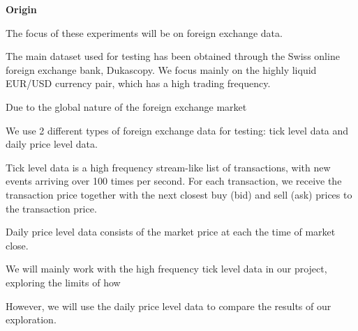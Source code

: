 \documentclass[../main.tex]{subfiles}
\begin{document}
\textbf{Origin}

The focus of these experiments will be on foreign exchange data. 

The main dataset used for testing has been obtained through the Swiss online foreign exchange bank, Dukascopy. We focus mainly on the highly liquid EUR/USD currency pair, which has a high trading frequency.

Due to the global nature of the foreign exchange market

We use 2 different types of foreign exchange data for testing: tick level data and daily price level data. 

Tick level data is a high frequency stream-like list of transactions, with new events arriving over 100 times per second. For each transaction, we receive the transaction price together with the next closest buy (bid) and sell (ask) prices to the transaction price. 

Daily price level data consists of the market price at each the time of market close. 

We will mainly work with the high frequency tick level data in our project, exploring the limits of how 

However, we will use the daily price level data to compare the results of our exploration. 

\begin{figure}[h!]
	\centering
	\\
	\label{fig:1__example_waveform_plots}
\end{figure}
\end{document}
